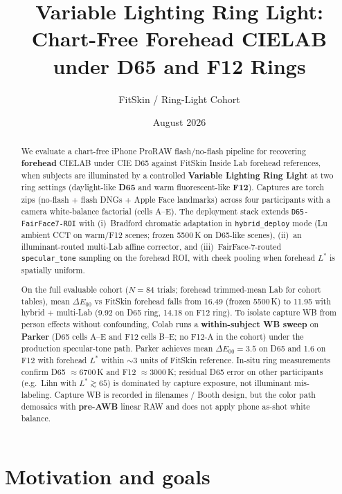 \documentclass[11pt]{article}
\title{Variable Lighting Ring Light:\\
  Chart-Free Forehead CIELAB under D65 and F12 Rings}
\author{FitSkin / Ring-Light Cohort}
\date{August 2026}
\newcommand{\deee}{\ensuremath{\Delta E_{00}}}
\newcommand{\pipename}{\texttt{D65-FairFace7-ROI}}
\begin{document}
\maketitle

\begin{abstract}
We evaluate a chart-free iPhone ProRAW flash/no-flash pipeline for recovering
\textbf{forehead} CIELAB under CIE D65 against FitSkin Inside Lab forehead
references, when subjects are illuminated by a controlled \textbf{Variable
Lighting Ring Light} at two ring settings (daylight-like \textbf{D65} and warm
fluorescent-like \textbf{F12}).
Captures are torch zips (no-flash + flash DNGs + Apple Face landmarks) across
four participants with a camera white-balance factorial (cells A--E).
The deployment stack extends \pipename{} with (i)~Bradford chromatic adaptation
in \texttt{hybrid\_deploy} mode (Lu ambient CCT on warm/F12 scenes; frozen
5500\,K on D65-like scenes), (ii)~an illuminant-routed multi-Lab affine
corrector, and (iii)~FairFace-7-routed \texttt{specular\_tone} sampling on the
forehead ROI, with cheek pooling when forehead $L^*$ is spatially uniform.

On the full evaluable cohort ($N=84$ trials; forehead trimmed-mean Lab for
cohort tables), mean $\deee$ vs FitSkin forehead falls from
\num{16.49} (frozen 5500\,K) to \num{11.95} with hybrid + multi-Lab
(\num{9.92} on D65 ring, \num{14.18} on F12 ring).
To isolate capture WB from person effects without confounding, Colab runs a
\textbf{within-subject WB sweep} on \textbf{Parker} (D65 cells A--E and F12
cells B--E; no F12-A in the cohort) under the production specular-tone path.
Parker achieves mean $\deee=\num{3.5}$ on D65 and \num{1.6} on F12 with
forehead $L^*$ within $\sim$3 units of FitSkin reference.
In-situ ring measurements confirm D65 $\approx$6700\,K and F12 $\approx$3000\,K;
residual D65 error on other participants (e.g.\ Lihn with $L^*\gtrsim 65$) is
dominated by capture exposure, not illuminant mis-labeling.
Capture WB is recorded in filenames / Booth design, but the color path demosaics
with \textbf{pre-AWB} linear RAW and does not apply phone as-shot white balance.
\end{abstract}

\tableofcontents
\newpage

\section{Motivation and goals}
\end{document}
